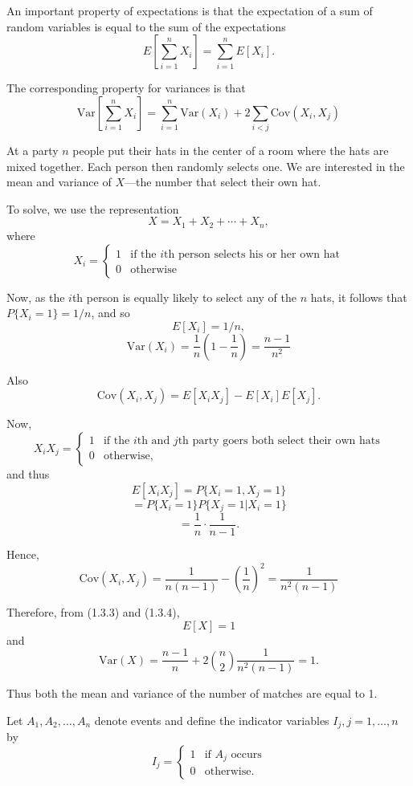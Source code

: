 \documentclass[lang=cn,10pt]{elegantbook}
\begin{document}
An important property of expectations is that the expectation of a sum of random variables is equal to the sum of the expectations
\begin{equation}
E\left[\sum_{i=1}^{n} X_i\right] = \sum_{i=1}^{n} E[X_i].
\end{equation}

The corresponding property for variances is that
\begin{equation}
\text{Var}\left[\sum_{i=1}^n X_i\right] = \sum_{i=1}^n \text{Var}(X_i) + 2 \sum_{i<j} \text{Cov}(X_i, X_j)
\end{equation}

\begin{example}
	At a party \(n\) people put their hats in the center of a room where the hats are mixed together. Each person then randomly selects one. We are interested in the mean and variance of \(X\)—the number that select their own hat.
\end{example} 
To solve, we use the representation
\[
X = X_1 + X_2 + \cdots + X_n,
\]
where
\[
X_i = \begin{cases}
1 & \text{if the } i\text{th person selects his or her own hat} \\
0 & \text{otherwise}
\end{cases}
\]

Now, as the \(i\)th person is equally likely to select any of the \(n\) hats, it follows that \(P\{X_i = 1\} = 1/n\), and so
\[
E[X_i] = 1/n,
\]
\[
\text{Var}(X_i) = \frac{1}{n}\left(1 - \frac{1}{n}\right) = \frac{n - 1}{n^2}
\]

Also
\[
\text{Cov}(X_i, X_j) = E[X_i X_j] - E[X_i]E[X_j].
\]

Now,
\[
X_i X_j = \begin{cases}
1 & \text{if the } i\text{th and } j\text{th party goers both select their own hats} \\
0 & \text{otherwise},
\end{cases}
\]
and thus
\[
E[X_i X_j] = P\{X_i = 1, X_j = 1\}
\]
\[
= P\{X_i = 1\} P\{X_j = 1 | X_i = 1\}
\]
\[
= \frac{1}{n} \cdot \frac{1}{n - 1}.
\]

Hence,
\[
\text{Cov}(X_i, X_j) = \frac{1}{n(n-1)} - \left(\frac{1}{n}\right)^2 = \frac{1}{n^2(n-1)}
\]

Therefore, from (1.3.3) and (1.3.4),
\[
E[X] = 1
\]
and
\[
\text{Var}(X) = \frac{n-1}{n} + 2 \binom{n}{2} \frac{1}{n^2(n-1)} = 1.
\]

Thus both the mean and variance of the number of matches are equal to 1. 
\begin{example}
	Let \(A_1, A_2, \ldots, A_n\) denote events and define the indicator variables \(I_j, j = 1, \ldots, n\) by
\[
I_j = \begin{cases}
1 & \text{if } A_j \text{ occurs} \\
0 & \text{otherwise}.
\end{cases}
\]
\end{example} 
\end{document}
